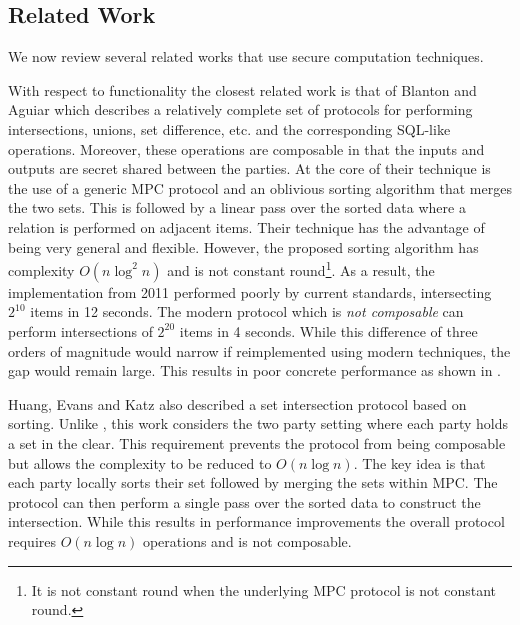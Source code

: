 \subsection{Related Work}
We now review several related works that use secure computation techniques.

With respect to functionality the closest related work is that of Blanton and Aguiar\cite{ASIACCS:BlaAgu12} which describes a relatively complete set of protocols for performing intersections, unions, set difference, etc. and the corresponding SQL-like operations. Moreover, these operations are composable in that the inputs and outputs are secret shared between the parties. At the core of their technique is the use of a generic MPC protocol and an oblivious sorting algorithm that merges the two sets. This is followed by a linear pass over the sorted data where a relation is performed on adjacent items. Their technique has the advantage of being very general and flexible. However, the proposed sorting algorithm has complexity $O(n \log^2 n)$ and is not constant round\footnote{It is not constant round when the underlying MPC protocol is not constant round.}. 
\iffullversion
As a result, the implementation from 2011 performed poorly by current standards, intersecting $2^{10}$ items in 12 seconds. The modern protocol \cite{CCS:KKRT16} which is \emph{not composable} can perform intersections of $2^{20}$ items in 4 seconds. While this difference of three orders of magnitude would narrow if reimplemented using modern techniques, the gap would remain large.
\else
This results in poor concrete performance as shown in .
\fi


\iffullversion
Huang, Evans and Katz\cite{HEK12} also described a set intersection protocol based on sorting. Unlike \cite{ASIACCS:BlaAgu12}, this work considers the two party setting where each party holds a set in the clear.
This requirement prevents the protocol from being composable but allows the complexity to be reduced to $O(n\log n)$. The key idea is that each party locally sorts their set followed by merging the sets within MPC. The protocol can then perform a single pass over the sorted data to construct the intersection. While this results in performance improvements the overall protocol requires  $O(n\log n)$ operations and is not composable.
\fi

